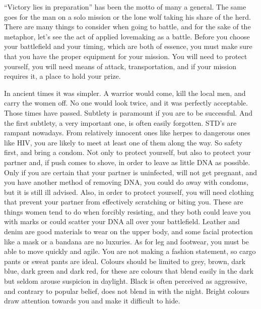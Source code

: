 
“Victory lies in preparation” has been the motto of many a general. The same 
goes for the man on a solo mission or the lone wolf taking his share of the 
herd. There are many things to consider when going to battle, and for the sake 
of the metaphor, let's see the act of applied lovemaking as a battle. Before 
you choose your battlefield and your timing, which are both of essence, you 
must make sure that you have the proper equipment for your mission. You will 
need to protect yourself, you will need means of attack, transportation, and if 
your mission requires it, a place to hold your prize.

In ancient times it was simpler. A warrior would come, kill the local men, and 
carry the women off. No one would look twice, and it was perfectly acceptable. 
Those times have passed. Subtlety is paramount if you are to be successful. And 
the first subtlety, a very important one, is often easily forgotten. STD's are 
rampant nowadays. From relatively innocent ones like herpes to  dangerous ones 
like HIV, you are likely to meet at least one of them along the way. So safety 
first, and bring a condom. Not only to protect yourself, but also to protect 
your partner and, if push comes to shove, in order to leave as little DNA as 
possible. Only if you are certain that your partner is uninfected, will not get 
pregnant, and you have another method of removing DNA, you could do away with 
condoms, but it is still ill advised. Also, in order to protect yourself, you 
will need clothing that prevent your partner from effectively scratching or 
biting you. These are things women tend to do when forcibly resisting, and they 
both could leave you with marks or could scatter your DNA all over your 
battlefield. Leather and denim are good materials to wear on the upper body, 
and some facial protection like a mask or a bandana are no luxuries. As for leg 
and footwear, you must be able to move quickly and agile. You are not making a 
fashion statement, so cargo pants or sweat pants are ideal. Colours should be 
limited to grey, brown, dark blue, dark green and dark red, for these are 
colours that blend easily in the dark but seldom arouse suspicion in daylight. 
Black is often perceived as aggressive, and contrary to popular belief, does 
not blend in with the night. Bright colours draw attention towards you and make 
it difficult to hide.


